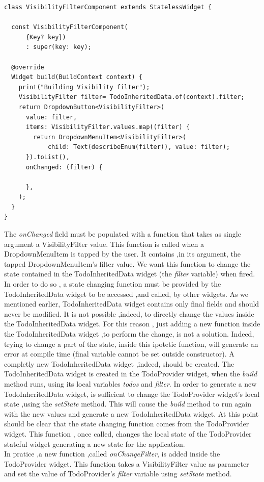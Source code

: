  \mbox{}

\begin{verbatim}
class VisibilityFilterComponent extends StatelessWidget {

  const VisibilityFilterComponent(
      {Key? key})
      : super(key: key);

  @override
  Widget build(BuildContext context) {
    print("Building Visibility filter");
    VisibilityFilter filter= TodoInheritedData.of(context).filter;
    return DropdownButton<VisibilityFilter>(
      value: filter,
      items: VisibilityFilter.values.map((filter) {
        return DropdownMenuItem<VisibilityFilter>(
            child: Text(describeEnum(filter)), value: filter);
      }).toList(),
      onChanged: (filter) {
        
      },
    );
  }
}
\end{verbatim}

The \textit{onChanged  }field must be populated with a function that takes as single argument a VisibilityFilter value. This function is called when a DropdownMenuItem is tapped by the user. It contains ,in its argument, the tapped DropdownMenuItem's filter value.  We want this function to change the state contained in the TodoInheritedData widget (the \textit{filter} variable) when fired. In order to do so , a state changing function must be provided by the TodoInheritedData widget to be accessed ,and called, by other widgets. As we mentioned earlier, TodoInheritedData widget contains only final fields and should never be modified. It is not possible ,indeed, to directly change the values inside the TodoInheritedData widget. For this reason , just adding a new function inside the TodoInheritedData widget ,to perform the change, is not a solution. Indeed, trying to change a part of the state, inside this ipotetic function, will generate an error at compile time (final variable cannot be set outside constructor). A completly new TodoInheritedData widget ,indeed, should be created. The TodoInheritedData widget is created in the TodoProvider widget, when the \textit{build} method runs, using its local variables \textit{todos }and \textit{filter}. In order to generate a new TodoInheritedData widget, is sufficient to change the TodoProvider widget's local state ,using the \textit{setState} method. This will cause the \textit{build} method to run again with the new values and generate a new TodoInheritedData widget. At this point should be clear that the state changing function comes from the TodoProvider widget. This function , once called, changes the local state of the TodoProvider stateful widget generating a new state for the application.\\
In pratice ,a new function ,called \textit{onChangeFilter}, is added inside the TodoProvider widget. This function takes a VisibilityFilter value as parameter and set the  value of TodoProvider's \textit{filter} variable using \textit{setState} method. 

